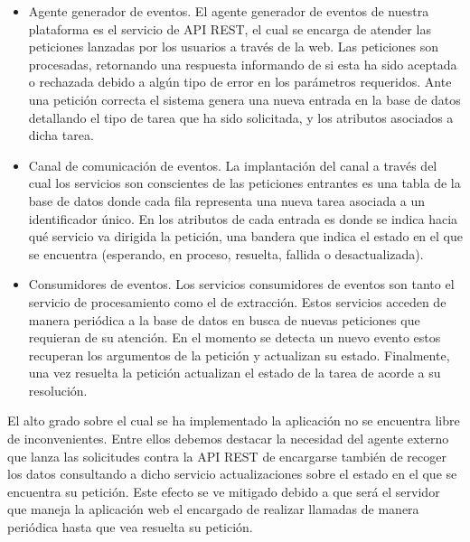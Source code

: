 \vspace{-0.5cm}
\begin{itemize}
\item [\textbullet] Agente generador de eventos. El agente generador de eventos de nuestra plataforma es el servicio de API REST, el cual se encarga de atender las peticiones lanzadas por los usuarios a través de la web. Las peticiones son procesadas, retornando una respuesta informando de si esta ha sido aceptada o rechazada debido a algún tipo de error en los parámetros requeridos.  Ante una petición correcta el sistema genera una nueva entrada en la base de datos detallando el tipo de tarea que ha sido solicitada, y los atributos asociados a dicha tarea.
\item [\textbullet] Canal de comunicación de eventos. La implantación del canal a través del cual los servicios son conscientes de las peticiones entrantes es una tabla de la base de datos donde cada fila representa una nueva tarea asociada a un identificador único. En los atributos de cada entrada es donde se indica hacia qué servicio va dirigida la petición, una bandera que indica el estado en el que se encuentra (esperando, en proceso, resuelta, fallida o desactualizada).
\item [\textbullet] Consumidores de eventos. Los servicios consumidores de eventos son tanto el servicio de procesamiento como el de extracción. Estos servicios acceden de manera periódica a la base de datos en busca de nuevas peticiones que requieran de su atención. En el momento se detecta un nuevo evento estos recuperan los argumentos de la petición y actualizan su estado. Finalmente, una vez resuelta la petición actualizan el estado de la tarea de acorde a su resolución.
\end{itemize}

El alto grado sobre el cual se ha implementado la aplicación no se encuentra libre de inconvenientes. Entre ellos debemos destacar la necesidad del agente externo que lanza las solicitudes contra la API REST de encargarse también de recoger los datos consultando a dicho servicio actualizaciones sobre el estado en el que se encuentra su petición. Este efecto se ve mitigado debido a que será el servidor que maneja la aplicación web el encargado de realizar llamadas de manera periódica hasta que vea resuelta su petición.

